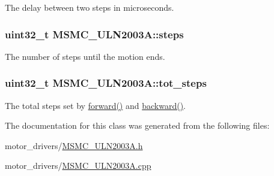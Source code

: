 The delay between two steps in microseconds. 

\hypertarget{class_m_s_m_c___u_l_n2003_a_afc5c41c229b3d634bd4aea51dcef7599}{
\subsubsection[{steps}]{\setlength{\rightskip}{0pt plus 5cm}uint32\+\_\+t M\+S\+M\+C\+\_\+\+U\+L\+N2003\+A\+::steps\hspace{0.3cm}{\ttfamily [private]}}}\label{class_m_s_m_c___u_l_n2003_a_afc5c41c229b3d634bd4aea51dcef7599}


The number of steps until the motion ends. 

\hypertarget{class_m_s_m_c___u_l_n2003_a_a8e1a83575d5ad2d15a8a81eccf1bdba6}{
\subsubsection[{tot\+\_\+steps}]{\setlength{\rightskip}{0pt plus 5cm}uint32\+\_\+t M\+S\+M\+C\+\_\+\+U\+L\+N2003\+A\+::tot\+\_\+steps\hspace{0.3cm}{\ttfamily [private]}}}\label{class_m_s_m_c___u_l_n2003_a_a8e1a83575d5ad2d15a8a81eccf1bdba6}


The total steps set by \hyperlink{class_m_s_m_c___u_l_n2003_a_a9657492f948a75472b311bc0b823899f}{forward()} and \hyperlink{class_m_s_m_c___u_l_n2003_a_ac46e6ec6345f95b534079bcf2920885e}{backward()}. 



The documentation for this class was generated from the following files\+:\begin{DoxyCompactItemize}
\item 
motor\+\_\+drivers/\hyperlink{_m_s_m_c___u_l_n2003_a_8h}{M\+S\+M\+C\+\_\+\+U\+L\+N2003\+A.\+h}\item 
motor\+\_\+drivers/\hyperlink{_m_s_m_c___u_l_n2003_a_8cpp}{M\+S\+M\+C\+\_\+\+U\+L\+N2003\+A.\+cpp}\end{DoxyCompactItemize}
